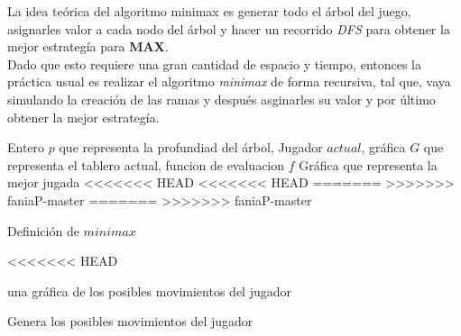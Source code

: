 \documentclass[12pt,twocolumn,draft]{article}
\begin{document}
La idea te\'orica del algoritmo minimax es generar todo el \'arbol del juego, asignarles valor a cada
nodo del \'arbol y hacer un recorrido \textit{DFS} para obtener la mejor estrateg\'ia para \textbf{MAX}.\\

Dado que esto requiere una gran cantidad de espacio y tiempo, entonces la pr\'actica usual es realizar
el algoritmo \textit{minimax} de forma recursiva, tal que, vaya simulando la creaci\'on de las ramas y despu\'es
asginarles su valor y por \'ultimo obtener la mejor estrateg\'ia.\\

\begin{algorithm}
\begin{algorithmic}[1]
\REQUIRE Entero $p$ que representa la profundiad del \'arbol, Jugador $actual$, gr\'afica $G$ que representa el tablero actual,
funcion de evaluacion $f$
\ENSURE  Gr\'afica que representa la mejor jugada
\ELSE
{}
\ENDIF
{}
\ELSE
{}
\ENDIF
\ELSE
{}
\ENDIF
\ENDIF
\ENDFOR
<<<<<<< HEAD
<<<<<<< HEAD
\ENDIF
{}
=======
>>>>>>> faniaP-master
=======
\ENDIF
{}
>>>>>>> faniaP-master
\end{algorithmic}
\caption{Definici\'on de $minimax$}
\label{minimax}
\end{algorithm}


<<<<<<< HEAD


\begin{algorithm}
\begin{algorithmic}[1]
\ENSURE una gr\'afica de los posibles movimientos del jugador
\ELSE 
{}
\ENDIF
\ENDFOR
\end{algorithmic}
\caption{Genera los posibles movimientos del jugador}
\label{c3}
\end{algorithm}
\end{document}
